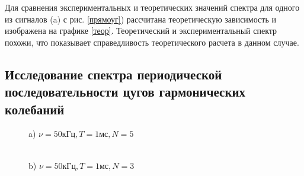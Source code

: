 \documentclass[a4paper,12pt]{article} %
\begin{document}
Для сравнения экспериментальных и теоретических значений спектра для одного из сигналов (a) с рис. \ref{прямоуг}) рассчитана теоретическую зависимость и изображена на графике \ref{теор}. Теоретический и экспериментальный спектр похожи, что показывает справедливость теоретического расчета в данном случае.


\newpage
\newpage
\newpage
\subsection*{Исследование спектра периодической последовательности цугов гармонических колебаний}

\begin{figure}[h!]
\begin{minipage}[h!]{0.47\linewidth}
 a) $\nu = 50 кГц, T = 1 мс, N = 5$\\
\end{minipage}
\hfill
\begin{minipage}[h!]{0.47\linewidth}
 \\b) $\nu = 50 кГц, T = 1 мс, N = 3$

\end{minipage}
\end{figure}
\end{document}
